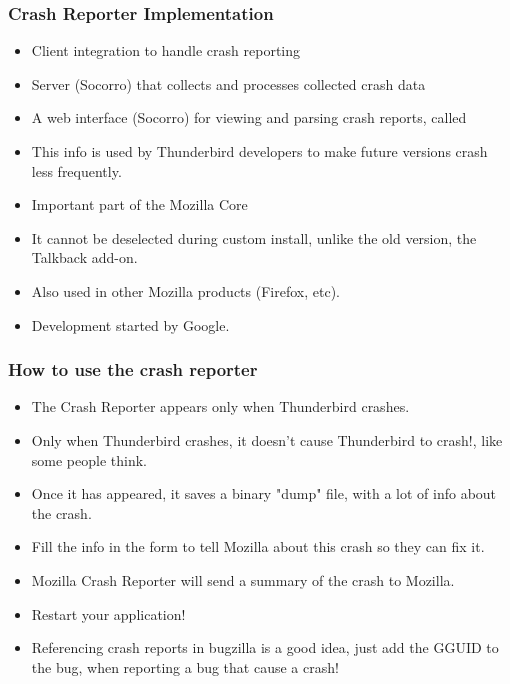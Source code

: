 \documentclass{beamer}
\begin{document}
\begin{frame}
 \frametitle{Crash Reporter Implementation}
 \begin{itemize}
   \item Client integration to handle crash reporting 
   \item Server (Socorro) that collects and processes collected crash data
   \item A web interface (Socorro) for viewing and parsing crash reports, called
   \item This info is used by Thunderbird developers to make future versions crash less frequently. 
   \item Important part of the Mozilla Core
   \item It cannot be deselected during custom install, unlike the old version, the Talkback add-on.
   \item Also used in other Mozilla products (Firefox, etc).
   \item Development started by Google.
 \end{itemize}
\end{frame}


\begin{frame}
 \frametitle{How to use the crash reporter}
 \begin{itemize}
  \item The Crash Reporter appears only when Thunderbird crashes.
  \item Only when Thunderbird crashes, it doesn't cause Thunderbird to crash!, like some people think.
  \item Once it has appeared, it saves a binary "dump" file, with a lot of info about the crash.
  \item Fill the info in the form to tell Mozilla about this crash so they can fix it.
  \item Mozilla Crash Reporter will send a summary of the crash to Mozilla.
  \item Restart your application!
  \item Referencing crash reports in bugzilla is a good idea, just add the GGUID to the bug, when reporting a bug that cause a crash!
 \end{itemize}
\end{frame}

\end{document}
